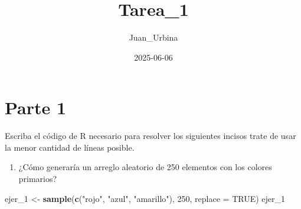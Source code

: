 \documentclass[
]{article}
\title{Tarea\_1}
\author{Juan\_Urbina}
\date{2025-06-06}
\newenvironment{Shaded}{\begin{snugshade}}{\end{snugshade}}
\newcommand{\AttributeTok}[1]{\textcolor[rgb]{0.13,0.29,0.53}{#1}}
\newcommand{\ConstantTok}[1]{\textcolor[rgb]{0.56,0.35,0.01}{#1}}
\newcommand{\DecValTok}[1]{\textcolor[rgb]{0.00,0.00,0.81}{#1}}
\newcommand{\FunctionTok}[1]{\textcolor[rgb]{0.13,0.29,0.53}{\textbf{#1}}}
\newcommand{\NormalTok}[1]{#1}
\newcommand{\OtherTok}[1]{\textcolor[rgb]{0.56,0.35,0.01}{#1}}
\newcommand{\StringTok}[1]{\textcolor[rgb]{0.31,0.60,0.02}{#1}}
\providecommand{\tightlist}{%
  \setlength{\itemsep}{0pt}\setlength{\parskip}{0pt}}
\begin{document}
\maketitle

\section{Parte 1}\label{parte-1}

Escriba el código de R necesario para resolver los siguientes incisos
trate de usar la menor cantidad de líneas posible.

\begin{enumerate}
\def\labelenumi{\arabic{enumi}.}
\tightlist
\item
  ¿Cómo generaría un arreglo aleatorio de 250 elementos con los colores
  primarios?
\end{enumerate}

\begin{Shaded}
\begin{Highlighting}[]
\NormalTok{ejer\_1 }\OtherTok{\textless{}{-}} \FunctionTok{sample}\NormalTok{(}\FunctionTok{c}\NormalTok{(}\StringTok{"rojo"}\NormalTok{, }\StringTok{"azul"}\NormalTok{, }\StringTok{"amarillo"}\NormalTok{), }\DecValTok{250}\NormalTok{, }\AttributeTok{replace =} \ConstantTok{TRUE}\NormalTok{)}
\NormalTok{ejer\_1}
\end{Highlighting}
\end{Shaded}
\end{document}
